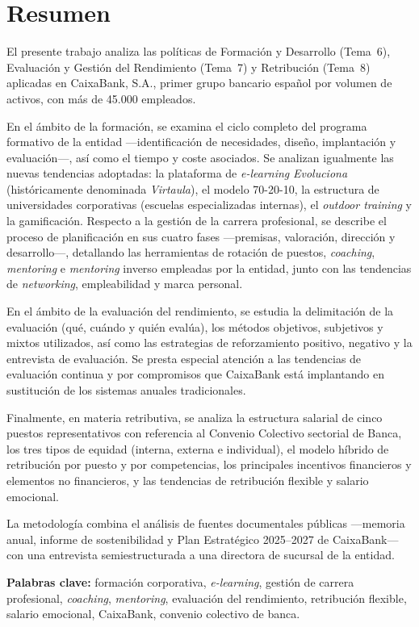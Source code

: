 
\chapter{Resumen}

El presente trabajo analiza las políticas de Formación y Desarrollo
(Tema~6), Evaluación y Gestión del Rendimiento (Tema~7) y Retribución
(Tema~8) aplicadas en CaixaBank, S.A., primer grupo bancario español
por volumen de activos, con más de 45.000 empleados.

En el ámbito de la formación, se examina el ciclo completo del programa
formativo de la entidad —identificación de necesidades, diseño,
implantación y evaluación—, así como el tiempo y coste asociados.
Se analizan igualmente las nuevas tendencias adoptadas: la plataforma
de \textit{e-learning} \textit{Evoluciona} (históricamente denominada \textit{Virtaula}),
el modelo 70-20-10, la estructura de
universidades corporativas (escuelas especializadas internas),
el \textit{outdoor training} y la gamificación. Respecto a la gestión
de la carrera profesional, se describe el proceso de planificación
en sus cuatro fases —premisas, valoración, dirección y desarrollo—,
detallando las herramientas de rotación de puestos, \textit{coaching},
\textit{mentoring} e \textit{mentoring} inverso empleadas por la entidad,
junto con las tendencias de \textit{networking}, empleabilidad y marca
personal.

En el ámbito de la evaluación del rendimiento, se estudia la delimitación
de la evaluación (qué, cuándo y quién evalúa), los métodos objetivos,
subjetivos y mixtos utilizados, así como las estrategias de reforzamiento
positivo, negativo y la entrevista de evaluación. Se presta especial
atención a las tendencias de evaluación continua y por compromisos que
CaixaBank está implantando en sustitución de los sistemas anuales
tradicionales.

Finalmente, en materia retributiva, se analiza la estructura salarial de
cinco puestos representativos con referencia al Convenio Colectivo
sectorial de Banca, los tres tipos de equidad (interna, externa e
individual), el modelo híbrido de retribución por puesto y por
competencias, los principales incentivos financieros y elementos no
financieros, y las tendencias de retribución flexible y salario emocional.

La metodología combina el análisis de fuentes documentales públicas
—memoria anual, informe de sostenibilidad y Plan Estratégico
2025--2027 de CaixaBank— con una entrevista semiestructurada a una
directora de sucursal de la entidad.

\medskip

\textbf{Palabras clave:} formación corporativa, \textit{e-learning},
gestión de carrera profesional, \textit{coaching}, \textit{mentoring},
evaluación del rendimiento, retribución flexible, salario emocional,
CaixaBank, convenio colectivo de banca.

\cleardoublepage
\endinput
